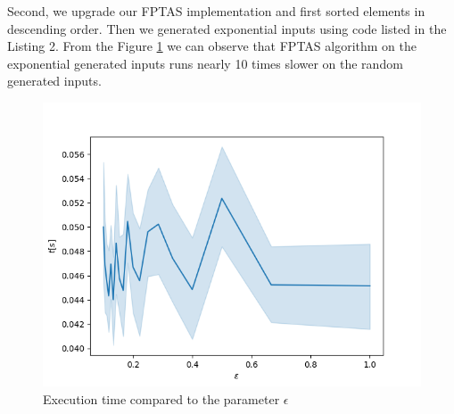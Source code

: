 \documentclass[a4paper,11pt]{article}
\theoremstyle{mytheor}
\begin{document}
Second, we upgrade our FPTAS implementation and first sorted elements in descending order. Then we generated exponential inputs using code listed in the Listing 2. From the Figure \ref{img:eval-fptas-hard} we can observe that FPTAS algorithm on the exponential generated inputs runs nearly 10 times slower on the random generated inputs.

\begin{figure}[H]
  \includegraphics[width=.8\textwidth]{output/eval-fptas-hard}
  \centering
  \caption{Execution time compared to the parameter $\epsilon$}
  \label{img:eval-fptas-hard}
\end{figure}

\newpage



\end{document}

